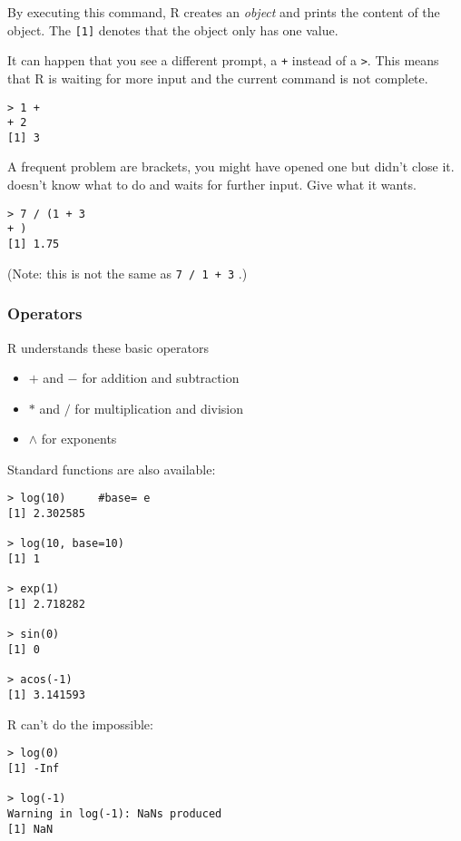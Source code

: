 By executing this command, \textsf{R} creates an \textit{object} and prints the content of the object. The \texttt{[1]} denotes that the object only has one value.

It can happen that you see a different prompt, a \texttt{+} instead of a \texttt{>}. This means that \textsf{R} is waiting for more input and the current command is not complete.

\begin{lstlisting}
> 1 +
+ 2
[1] 3
\end{lstlisting} 

A frequent problem are brackets, you might have opened one but didn't close it. \R doesn't know what to do and waits for further input. Give \R what it wants.

\begin{lstlisting}
> 7 / (1 + 3
+ )
[1] 1.75
\end{lstlisting}

(Note: this is not the same as \texttt{7 / 1 + 3} .)

\vspace*{0.5cm}

\newpage
\subsubsection*{Operators}

\textsf{R} understands these basic operators

\begin{itemize}
\item $+$ and $-$ for addition and subtraction
\item $*$ and $/$ for multiplication and division
\item $\wedge$ for exponents
\end{itemize}

Standard functions are also available:

\begin{lstlisting}
> log(10)     #base= e
[1] 2.302585

> log(10, base=10)
[1] 1

> exp(1)
[1] 2.718282

> sin(0)
[1] 0

> acos(-1)
[1] 3.141593
\end{lstlisting}

\textsf{R} can't do the impossible:

\begin{lstlisting}
> log(0)
[1] -Inf

> log(-1)
Warning in log(-1): NaNs produced
[1] NaN
\end{lstlisting}

